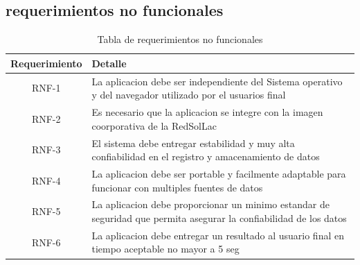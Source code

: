 \subsection{requerimientos no funcionales}
\begin{table}[h!]
\caption{Tabla de requerimientos no funcionales}
\label{tablaNoFuncional}
\begin{tabular}{| c | p{11cm} |}
	\hline
	\textbf{Requerimiento}	&	\textbf{Detalle}	\\
	\hline
	RNF-1	&	La aplicacion debe ser independiente del Sistema operativo y del navegador utilizado por el usuarios final	\\
	\hline
	RNF-2	&	Es necesario que la aplicacion se integre con la imagen coorporativa de la RedSolLac	\\
	\hline
	RNF-3	&	El sistema debe entregar estabilidad y muy alta confiabilidad en el registro y amacenamiento de datos	\\
	\hline
	RNF-4	&	La aplicacion debe ser portable y facilmente adaptable para funcionar con multiples fuentes de datos 	\\
	\hline
	RNF-5	&	La aplicacion debe proporcionar un minimo estandar de seguridad que permita asegurar la confiabilidad de los datos	\\
	\hline
	RNF-6	&	La aplicacion debe entregar un resultado al usuario final en tiempo aceptable no mayor a 5 seg	\\
	\hline
\end{tabular}
\end{table}


